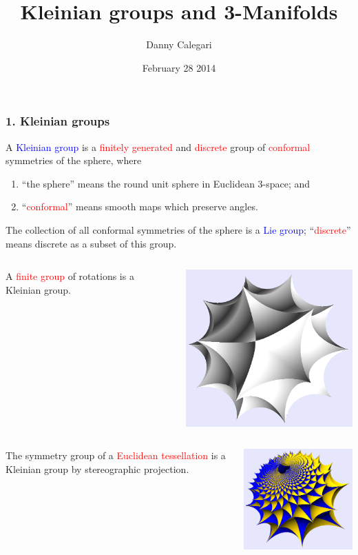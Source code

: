 \documentclass{beamer}
\title{Kleinian groups and 3-Manifolds}
\author{Danny Calegari}
\date{February 28 2014}
\begin{document}
\frame{\titlepage}
\frame
{
\frametitle{1. Kleinian groups}

A \textcolor{blue}{Kleinian group} is a \textcolor{red}{finitely generated} and 
\textcolor{red}{discrete} group of \textcolor{red}{conformal} symmetries of the 
\textcolor{dgreen}{sphere}, where

\begin{enumerate}
\item{``the \textcolor{dgreen}{sphere}'' means the round unit sphere in Euclidean 3-space; and}
\item{``\textcolor{red}{conformal}'' means smooth maps which preserve angles.}
\end{enumerate}

The collection of all conformal symmetries of the sphere is a \textcolor{blue}{Lie group}; ``\textcolor{red}{discrete}''
means discrete as a subset of this group.
}
\frame
{
\begin{columns}[c]
\column{1in}
A \textcolor{red}{finite group} of
rotations is a Kleinian group.
\column{3in}
\begin{center}
\includegraphics[width=3in]{icosahedron.png}
\end{center}
\end{columns}
}
\frame
{
\begin{columns}[c]
\column{1.1in}
The symmetry group of a 
\textcolor{red}{Euclidean tessellation}
is a Kleinian group
by stereographic
projection.
\column{3in}
\begin{center}
\includegraphics[width=3in]{parabolic.png}
\end{center}
\end{columns}
}
\end{document}
